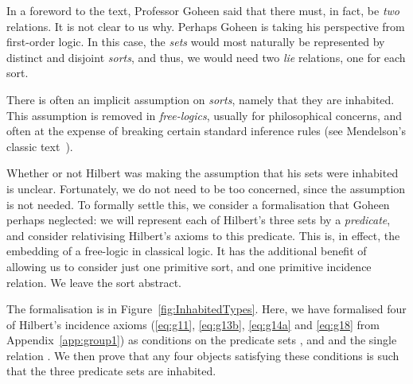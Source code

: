 In a foreword to the text, Professor Goheen said that there must, in fact, be \emph{two} relations. It is not clear to us why. Perhaps Goheen is taking his perspective from first-order logic. In this case, the \emph{sets} would most naturally be represented by distinct and disjoint \emph{sorts}, and thus, we would need two \emph{lie} relations, one for each sort. 

There is often an implicit assumption on \emph{sorts}, namely that they are inhabited. This assumption is removed in \emph{free-logics}, usually for philosophical concerns, and often at the expense of breaking certain standard inference rules (see Mendelson's classic text~\cite{Mendelson}). 

Whether or not Hilbert was making the assumption that his sets were inhabited is unclear. Fortunately, we do not need to be too concerned, since the assumption is not needed. To formally settle this, we consider a formalisation that Goheen perhaps neglected: we will represent each of Hilbert's three sets by a \emph{predicate}, and consider relativising Hilbert's axioms to this predicate. This is, in effect, the embedding of a free-logic in classical logic. It has the additional benefit of allowing us to consider just one primitive sort, and one primitive incidence relation. We leave the sort abstract.

The formalisation is in Figure~\ref{fig:InhabitedTypes}. Here, we have formalised four of Hilbert's incidence axioms (\ref{eq:g11}, \ref{eq:g13b}, \ref{eq:g14a} and \ref{eq:g18} from Appendix~\ref{app:group1}) as conditions on the predicate sets ,  and  and the single relation . We then prove that any four objects satisfying these conditions is such that the three predicate sets are inhabited.

